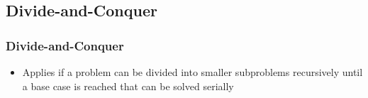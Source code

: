 \documentclass[xcolor=dvipsnames]{beamer}
\begin{document}
	\subsection{Divide-and-Conquer}
		\begin{frame} \frametitle{Divide-and-Conquer}
			\begin{itemize}
				\item Applies if a problem can be divided into smaller 
                subproblems recursively until a base case is reached that can
                be solved serially
			\end{itemize}
		\end{frame}
\end{document}
